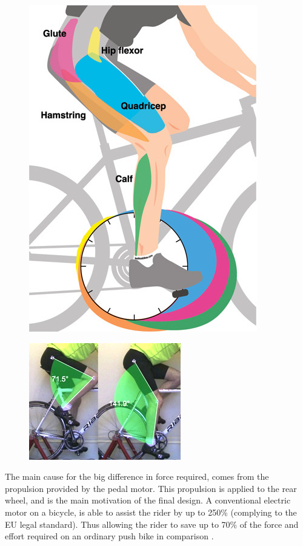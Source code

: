 \documentclass[a4paper,11pt]{article}
\begin{document}
\begin{figure}[!ht]
\centering
	\begin{minipage}{.5\textwidth}
		  \centering
		  \includegraphics[width=.4\linewidth]{peds}
		  \label{fig:peds}
		  \cite{lee08}
	\end{minipage}%
	\begin{minipage}{.5\textwidth}
		  \centering
		  \includegraphics[width=.75\linewidth]{knex}
		  \label{fig:knex}
		  \cite{bd16}
	\end{minipage}
\end{figure}

The main cause for the big difference in force required, comes from the propulsion provided by the pedal motor. This propulsion is applied to the rear wheel, and is the main motivation of the final design. A conventional electric motor on a bicycle, is able to assist the rider by up to 250\% (complying to the EU legal standard). Thus allowing the rider to save up to 70\% of the force and effort required on an ordinary push bike in comparison \cite{bosch18}.
\end{document}
